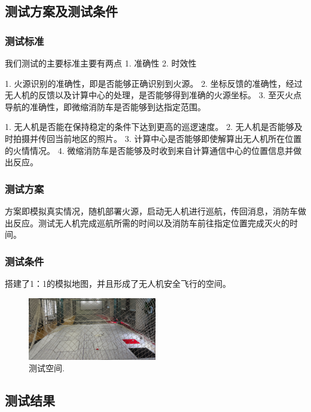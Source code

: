 \documentclass[12pt, a4paper, oneside]{article}
\begin{document}
\subsection{测试方案及测试条件}

\subsubsection{测试标准}

我们测试的主要标准主要有两点 1. 准确性 2. 时效性


1. 火源识别的准确性，即是否能够正确识别到火源。
2. 坐标反馈的准确性，经过无人机的反馈以及计算中心的处理，是否能够得到准确的火源坐标。
3. 至灭火点导航的准确性，即微缩消防车是否能够到达指定范围。


1. 无人机是否能在保持稳定的条件下达到更高的巡逻速度。
2. 无人机是否能够及时拍摄并传回当前地区的照片。
3. 计算中心是否能够即使解算出无人机所在位置的火情情况。
4. 微缩消防车是否能够及时收到来自计算通信中心的位置信息并做出反应。

\subsubsection{测试方案}

方案即模拟真实情况，随机部署火源，启动无人机进行巡航，传回消息，消防车做出反应。测试无人机完成巡航所需的时间以及消防车前往指定位置完成灭火的时间。

\subsubsection{测试条件}

搭建了1：1的模拟地图，并且形成了无人机安全飞行的空间。

\begin{figure}[H]
    \centering
    \includegraphics[width=0.5\textwidth]{49bd6c4da1d815bf96125a79fc2dbed.jpg}
    \caption{测试空间.}
    \label{测试空间}
\end{figure}


\subsection{测试结果}
\end{document}
